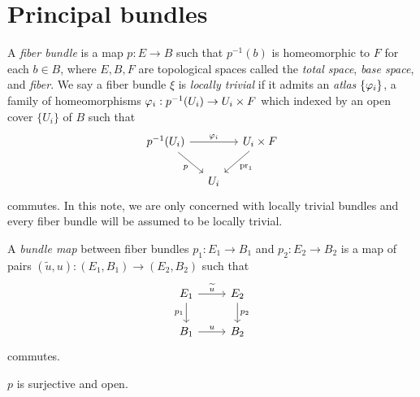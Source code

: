 \documentclass{../../large}
\begin{document}
\section{Principal bundles}

\begin{prb}
A \emph{fiber bundle} is a map $p:E\to B$ such that $p^{-1}(b)$ is homeomorphic to $F$ for each $b\in B$, where $E,B,F$ are topological spaces called the \emph{total space}, \emph{base space}, and \emph{fiber}.
We say a fiber bundle $\xi$ is \emph{locally trivial} if it admits an \emph{atlas} $\{\varphi_i\}$, a family of homeomorphisms $\varphi_i:p^{-1}(U_i)\to U_i\times F$ which indexed by an open cover $\{U_i\}$ of $B$ such that
\[\begin{tikzcd}[column sep=small]
p^{-1}(U_i) \ar[swap]{dr}{p}\ar{rr}{\f_i} & & U_i\times F \ar{dl}{\pr_1} \\
& U_i &
\end{tikzcd}\]
commutes.
In this note, we are only concerned with locally trivial bundles and every fiber bundle will be assumed to be locally trivial.

A \emph{bundle map} between fiber bundles $p_1:E_1\to B_1$ and $p_2:E_2\to B_2$ is a map of pairs $(\tilde u,u):(E_1,B_1)\to(E_2,B_2)$ such that
\[\begin{tikzcd}
E_1 \ar[swap]{d}{p_1}\ar{r}{\tilde u} & E_2 \ar{d}{p_2} \\
B_1 \ar{r}{u} & B_2
\end{tikzcd}\]
commutes.
\begin{parts}
\item $p$ is surjective and open.
\end{parts}
\end{prb}
\end{document}
